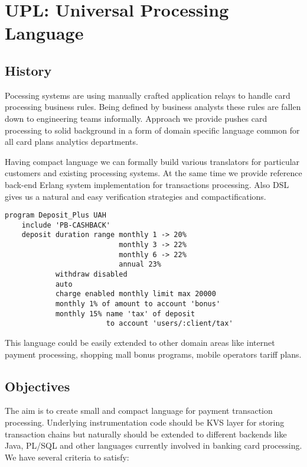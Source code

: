 \section{UPL: Universal Processing Language}

\subsection{History}

Pocessing systems are using manually crafted application
relays to handle card processing business rules. Being defined by business
analysts these rules are fallen down to engineering teams informally.
Approach we provide pushes card processing to solid background in a form
of domain specific language common for all card plans analytics departments.

Having compact language we can formally build various translators
for particular customers and existing processing systems. At the same time
we provide reference back-end Erlang system implementation
for transactions processing. Also DSL gives us a natural and easy
verification strategies and compactifications.

\vspace{1\baselineskip}
\begin{lstlisting}[caption=Deposit Program]
    program Deposit_Plus UAH
    include 'PB-CASHBACK'
    deposit duration range monthly 1 -> 20%
                           monthly 3 -> 22%
                           monthly 6 -> 22%
                           annual 23%
            withdraw disabled
            auto
            charge enabled monthly limit max 20000
            monthly 1% of amount to account 'bonus'
            monthly 15% name 'tax' of deposit 
                        to account 'users/:client/tax'
\end{lstlisting}
\vspace{1\baselineskip}

This language could be easily extended to other domain areas like
internet payment processing, shopping mall bonus programs, mobile
operators tariff plans.

\newpage
\subsection{Objectives}

The aim is to create small and compact language for payment
transaction processing. Underlying instrumentation
code should be KVS layer for storing transaction chains but
naturally should be extended to different backends like Java,
PL/SQL and other languages currently involved in banking card processing.
We have several criteria to satisfy:

